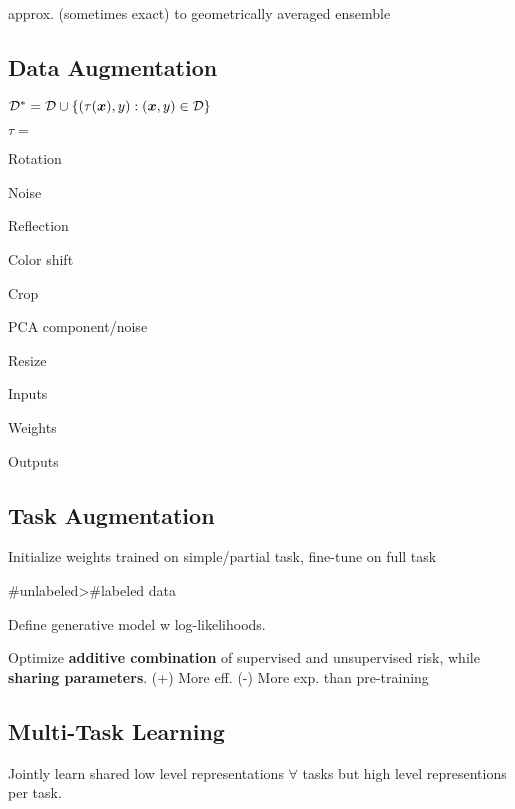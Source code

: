  approx. (sometimes exact) to geometrically averaged ensemble


\subsection*{Data Augmentation}
 $\mathcal{D}^*=\mathcal{D}\cup\{(\tau(\boldsymbol{x}),y) : (\boldsymbol{x},y)\in\mathcal{D} \}$

$\tau=$ 
\begin{inparaitem}[$\color{mygreen} \triangleright$]
\item Rotation
\item Noise
\item Reflection
\item Color shift
\item Crop
\item PCA component/noise
\item Resize
\end{inparaitem}

\begin{inparaitem}[$\color{mygreen} \triangleright$]
\item Inputs \item Weights \item Outputs
\end{inparaitem}

\subsection*{Task Augmentation}
Initialize weights trained on simple/partial task, fine-tune on full task

\#unlabeled>\#labeled data

Define generative model w log-likelihoods.

Optimize \textbf{additive combination} of supervised and unsupervised risk, while \textbf{sharing parameters}.
(+) More eff. (-) More exp. than pre-training

\subsection*{Multi-Task Learning}
Jointly learn shared low level representations $\forall$ tasks but high level representions per task.